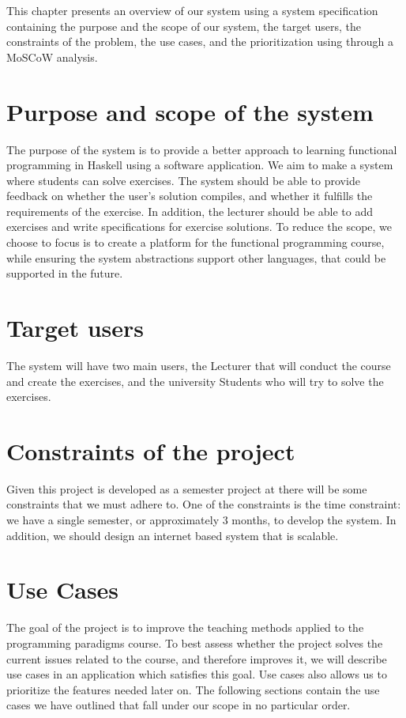 This chapter presents an overview of our system using a system specification containing the purpose and the scope of our system, the target users, the constraints of the problem, the use cases, and the prioritization using through a MoSCoW analysis.

\section*{Purpose and scope of the system }
The purpose of the system is to provide a better approach to learning functional programming in Haskell using a software application.
We aim to make a system where students can solve exercises. The system should be able to provide feedback on whether the user's solution compiles, and whether it fulfills the requirements of the exercise. 
In addition, the lecturer should be able to add exercises and write specifications for exercise solutions.
To reduce the scope, we choose to focus is to create a platform for the functional programming course, while ensuring the system abstractions support other languages, that could be supported in the future.

\section*{Target users}
The system will have two main users, the Lecturer that will conduct the course and create the exercises, and the university Students who will try to solve the exercises.


\section*{Constraints of the project}
Given this project is developed as a semester project at \aau{} there will be some constraints that we must adhere to. 
One of the constraints is the time constraint: we have a single semester, or approximately 3 months, to develop the system. 
In addition, we should design an internet based system that is scalable. 
 
\section*{Use Cases}
The goal of the project is to improve the teaching methods applied to the programming paradigms course. 
To best assess whether the project solves the current issues related to the course, and therefore improves it, we will describe use cases in an application which satisfies this goal.
Use cases also allows us to prioritize the features needed later on.
The following sections contain the use cases we have outlined that fall under our scope in no particular order.  

